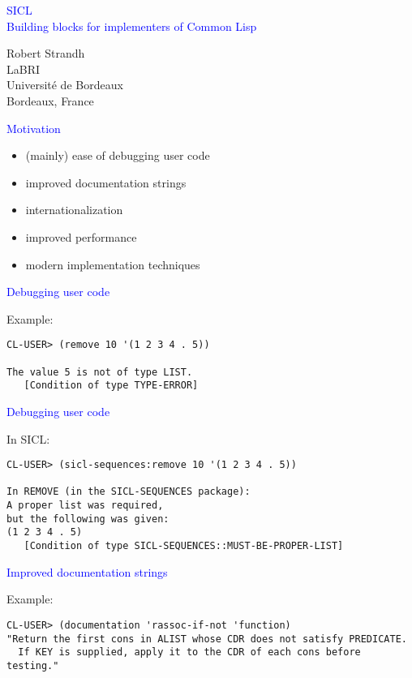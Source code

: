 \documentclass{slides}
\newcommand{\ti}[1]{\begin{center}\Large{\textcolor{blue}{#1}}\end{center}}
\begin{document}
\landscape
\setlength{\oddsidemargin}{1cm}
\setlength{\evensidemargin}{1cm}
\setlength{\marginparwidth}{1cm}
\setlength{\parskip}{0.5cm}
\setlength{\parindent}{0cm}
\begin{slide}\ti{SICL \\ Building blocks for implementers of Common Lisp}
\vskip 0.5cm
\begin{center}
Robert Strandh \\
LaBRI \\
Université de Bordeaux \\
Bordeaux, France
\end{center}
\vfill\end{slide}
\begin{slide}\ti{Motivation}
\vskip 0.5cm
\begin{itemize}
\item (mainly) ease of debugging user code
\item improved documentation strings
\item internationalization 
\item improved performance
\item modern implementation techniques
\end{itemize}
\vfill\end{slide}
\begin{slide}\ti{Debugging user code}
\small
Example:
\begin{verbatim}
CL-USER> (remove 10 '(1 2 3 4 . 5))

The value 5 is not of type LIST.
   [Condition of type TYPE-ERROR]
\end{verbatim}
\vfill\end{slide}
\begin{slide}\ti{Debugging user code}
In SICL:
\small
\begin{verbatim}
CL-USER> (sicl-sequences:remove 10 '(1 2 3 4 . 5))

In REMOVE (in the SICL-SEQUENCES package):
A proper list was required,
but the following was given:
(1 2 3 4 . 5)
   [Condition of type SICL-SEQUENCES::MUST-BE-PROPER-LIST]
\end{verbatim}
\vfill\end{slide}
\begin{slide}\ti{Improved documentation strings}
Example:
\small
\begin{verbatim}
CL-USER> (documentation 'rassoc-if-not 'function)
"Return the first cons in ALIST whose CDR does not satisfy PREDICATE.
  If KEY is supplied, apply it to the CDR of each cons before testing."
\end{verbatim}
\vfill\end{slide}
\end{document}

